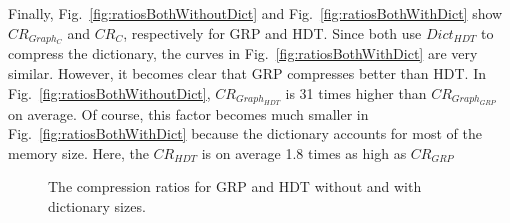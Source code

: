 Finally, Fig.~\ref{fig:ratiosBothWithoutDict} and Fig.~\ref{fig:ratiosBothWithDict} show $CR_{Graph_C}$ and $CR_C$, respectively for GRP and HDT. Since both use $Dict_{HDT}$ to compress the dictionary, the curves in Fig.~\ref{fig:ratiosBothWithDict} are very similar. However, it becomes clear that GRP compresses better than HDT. In Fig.~\ref{fig:ratiosBothWithoutDict}, $CR_{Graph_{HDT}}$ is 31 times higher than $CR_{Graph_{GRP}}$ on average. Of course, this factor becomes much smaller in Fig.~\ref{fig:ratiosBothWithDict} because the dictionary accounts for most of the memory size. Here, the $CR_{HDT}$ is on average 1.8 times as high as $CR_{GRP}$

\begin{figure}[h]
	\centering
	\hfill 
	\caption{The compression ratios for GRP and HDT without and with dictionary sizes.}
\end{figure}


